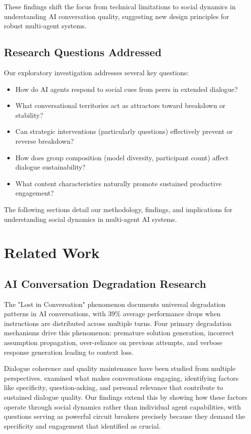 \documentclass[11pt,letterpaper]{article}
\begin{document}
These findings shift the focus from technical limitations to social dynamics in understanding AI conversation quality, suggesting new design principles for robust multi-agent systems.

\subsection{Research Questions Addressed}

Our exploratory investigation addresses several key questions:

\begin{itemize}
    \item How do AI agents respond to social cues from peers in extended dialogue?
    \item What conversational territories act as attractors toward breakdown or stability?
    \item Can strategic interventions (particularly questions) effectively prevent or reverse breakdown?
    \item How does group composition (model diversity, participant count) affect dialogue sustainability?
    \item What content characteristics naturally promote sustained productive engagement?
\end{itemize}

The following sections detail our methodology, findings, and implications for understanding social dynamics in multi-agent AI systems.

\section{Related Work}

\subsection{AI Conversation Degradation Research}

The "Lost in Conversation" phenomenon \citep{laban2025lost} documents universal degradation patterns in AI conversations, with 39\% average performance drops when instructions are distributed across multiple turns. Four primary degradation mechanisms drive this phenomenon: premature solution generation, incorrect assumption propagation, over-reliance on previous attempts, and verbose response generation leading to context loss.

Dialogue coherence and quality maintenance have been studied from multiple perspectives. \citet{see2019makes} examined what makes conversations engaging, identifying factors like specificity, question-asking, and personal relevance that contribute to sustained dialogue quality. Our findings extend this by showing how these factors operate through social dynamics rather than individual agent capabilities, with questions serving as powerful circuit breakers precisely because they demand the specificity and engagement that \citet{see2019makes} identified as crucial.
\end{document}
